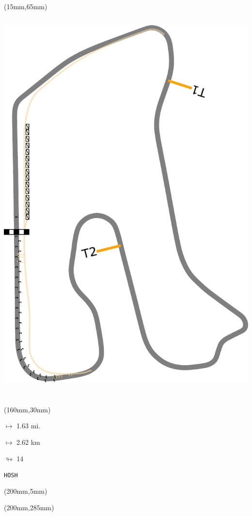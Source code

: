 \begin{textblock*}{185mm}(15mm,65mm)%
\centering
\mbox{\includegraphics[width=185mm,height=210mm,keepaspectratio]{PT/HOSH.pdf}}
\end{textblock*}
\begin{textblock*}{40mm}(160mm,30mm)%
\Large
\par$\mapsto$ 1.63 mi.
\par$\mapsto$ 2.62 km
\par$\looparrowright$ 14
\par\hfill\tiny\tt HOSH\\
\end{textblock*}
\begin{textblock*}{20mm}(200mm,5mm)%
\fbox{\thepage}
\label{HOSH}
\end{textblock*}
\begin{textblock*}{20mm}(200mm,285mm)%
\fbox{\thepage}
\end{textblock*}

